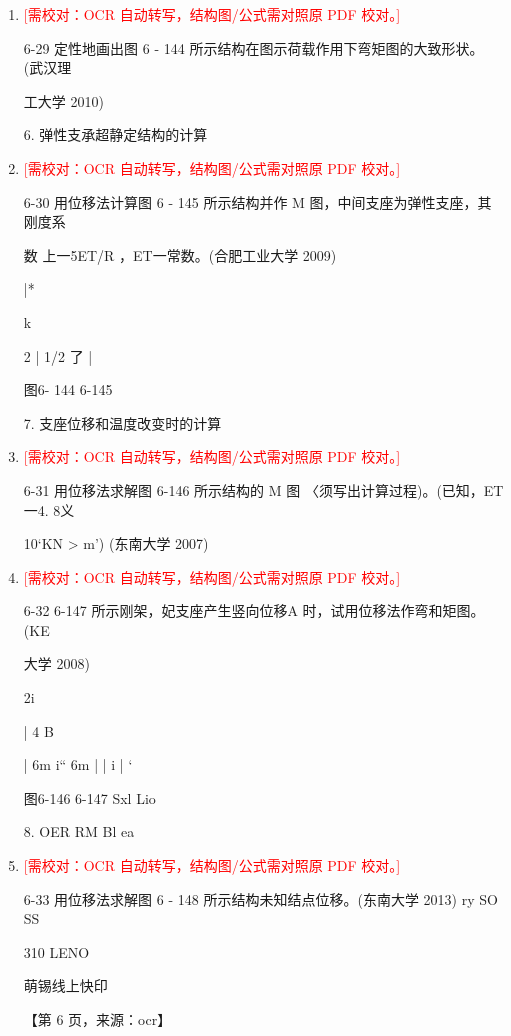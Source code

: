 \documentclass[UTF8,12pt,a4paper,openany]{ctexbook}
\newcommand{\TODO}[1]{\textcolor{red}{[需校对：#1]}}
\begin{document}
\begin{enumerate}[label=\textbf{\arabic*.},leftmargin=2em]
\item \TODO{OCR 自动转写，结构图/公式需对照原 PDF 校对。}\par 6-29 定性地画出图 6 - 144 所示结构在图示荷载作用下弯矩图的大致形状。 (武汉理\par 工大学 2010)\par 6. 弹性支承超静定结构的计算
\item \TODO{OCR 自动转写，结构图/公式需对照原 PDF 校对。}\par 6-30 用位移法计算图 6 - 145 所示结构并作 M 图，中间支座为弹性支座，其刚度系\par 数 上一5ET/R ，ET一常数。(合肥工业大学 2009)\par |*\par k\par 2   |   1/2          了       |\par 图6- 144 6-145\par 7. 支座位移和温度改变时的计算
\item \TODO{OCR 自动转写，结构图/公式需对照原 PDF 校对。}\par 6-31 用位移法求解图 6-146 所示结构的 M 图 〈须写出计算过程)。(已知，ET一4. 8义\par 10‘KN > m’) (东南大学 2007)
\item \TODO{OCR 自动转写，结构图/公式需对照原 PDF 校对。}\par 6-32 6-147 所示刚架，妃支座产生竖向位移A 时，试用位移法作弯和矩图。 (KE\par 大学 2008)\par 2i\par |                         4              B\par |      6m    i“      6m     |                 |        i         |    ‘\par 图6-146 6-147              Sxl Lio\par 8. OER RM                                       Bl ea
\item \TODO{OCR 自动转写，结构图/公式需对照原 PDF 校对。}\par 6-33 用位移法求解图 6 - 148 所示结构未知结点位移。(东南大学 2013) ry SO SS\par 310                                                                                                        LENO\par 萌锡线上快印\par \par 【第 6 页，来源：ocr】

\end{enumerate}
\end{document}
